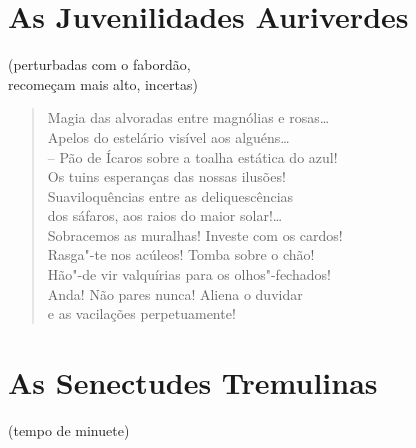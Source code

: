\section*{As Juvenilidades Auriverdes}

\begin{flushright}
(perturbadas com o fabordão,\\
recomeçam mais alto, incertas)
\end{flushright}

\begin{verse}
Magia das alvoradas entre magnólias e rosas\ldots{}\\
Apelos do estelário visível aos alguéns\ldots{}\\
-- Pão de Ícaros sobre a toalha estática do azul!\\
Os tuins esperanças das nossas ilusões!\\
Suaviloquências entre as deliquescências\\
dos sáfaros, aos raios do maior solar!\ldots{}\\
Sobracemos as muralhas! Investe com os cardos!\\
Rasga"-te nos acúleos! Tomba sobre o chão!\\
Hão"-de vir valquírias para os olhos"-fechados!\\
Anda! Não pares nunca! Aliena o duvidar\\
e as vacilações perpetuamente!
\end{verse}

\section*{As Senectudes Tremulinas}

\begin{flushright}
(tempo de minuete)
\end{flushright}

